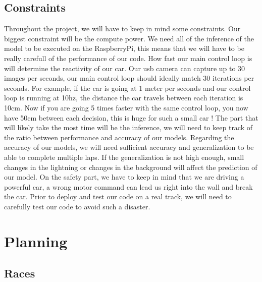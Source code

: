 \documentclass[12pt]{article}
\begin{document}
\subsection{Constraints}
Throughout the project, we will have to keep in mind some constraints.
Our biggest constraint will be the compute power. We need all of the inference of the model to be executed on the RaspberryPi, this means that we will have to be really carefull of the performance of our code. How fast our main control loop is will determine the reactivity of our car. Our usb camera can capture up to 30 images per seconds, our main control loop should ideally match 30 iterations per seconds. For example, if the car is going at 1 meter per seconds and our control loop is running at 10hz, the distance the car travels between each iteration is 10cm. Now if you are going 5 times faster with the same control loop, you now have 50cm between each decision, this is huge for such a small car ! The part that will likely take the most time will be the inference, we will need to keep track of the ratio between performance and accuracy of our models.
Regarding the accuracy of our models, we will need sufficient accuracy and generalization to be able to complete multiple laps. If the generalization is not high enough, small changes in the lightning or changes in the background will affect the prediction of our model.
On the safety part, we have to keep in mind that we are driving a powerful car, a wrong motor command can lead us right into the wall and break the car. Prior to deploy and test our code on a real track, we will need to carefully test our code to avoid such a disaster.

\section {Planning}
\subsection {Races}
\end{document}
